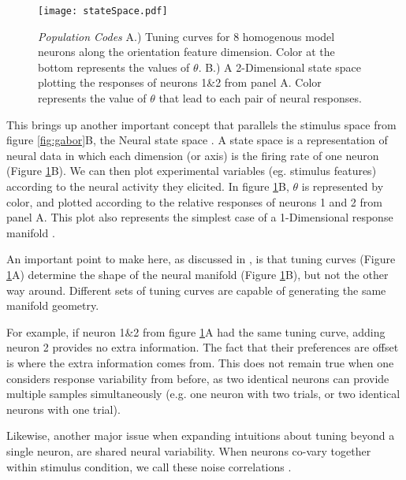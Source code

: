 \begin{figure}[h]
	\centerline{\texttt{[image: stateSpace.pdf]}}
	\caption{\textit{Population Codes} A.) Tuning curves for 8 homogenous model neurons along the orientation feature dimension. Color at the bottom represents the values of $\theta$. B.) A 2-Dimensional state space plotting the responses of neurons 1\&2 from panel A. Color represents the value of $\theta$ that lead to each pair of neural responses.  }
	\label{fig:stateSpace}
\end{figure}

This brings up another important concept that parallels the stimulus space from figure \ref{fig:gabor}B, the Neural state space \parencite{Paninski2010,Cross2021a}. A state space is a representation of neural data in which each dimension (or axis) is the firing rate of one neuron (Figure \ref{fig:stateSpace}B). We can then plot experimental variables (eg. stimulus features) according to the neural activity they elicited. In figure \ref{fig:stateSpace}B, $\theta$ is represented by color, and plotted according to the relative responses of neurons 1 and 2 from panel A. This plot also represents the simplest case of a 1-Dimensional response manifold \parencite{Kriegeskorte2021, Chung2018}. 

An important point to make here, as discussed in \textcite{Kriegeskorte2021}, is that tuning curves (Figure \ref{fig:stateSpace}A) determine the shape of the neural manifold (Figure \ref{fig:stateSpace}B), but not the other way around. Different sets of tuning curves are capable of generating the same manifold geometry. 


For example, if neuron 1\&2 from figure \ref{fig:stateSpace}A had the same tuning curve, adding neuron 2 provides no extra information. The fact that their preferences are offset is where the extra information comes from. This does not remain true when one considers response variability from before, as two identical neurons can provide multiple samples simultaneously (e.g. one neuron with two trials, or two identical neurons with one trial). 

Likewise, another major issue when expanding intuitions about tuning beyond a single neuron, are shared neural variability. When neurons co-vary together within stimulus condition, we call these noise correlations \parencite{Cohen2009, Ruff2016, Snyder2014, Moreno-Bote2014a}.



